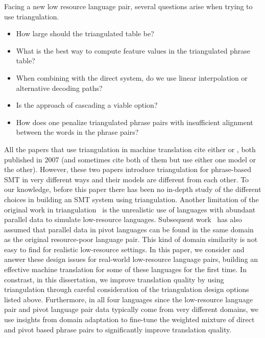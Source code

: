 Facing a new low resource language pair, several questions arise when trying to use triangulation. 

\begin{itemize}\addtolength{\itemsep}{-0.4\baselineskip}
        \item How large should the triangulated table be?
        \item What is the best way to compute feature values in the triangulated phrase table?
        \item When combining with the direct system, do we use linear interpolation or alternative decoding paths?
        \item Is the approach of cascading a viable option?
        \item How does one penalize triangulated phrase pairs with insufficient alignment between the words in the phrase pairs?
\end{itemize}


All the papers that use triangulation in machine translation cite either \cite{Utiyama:07} or \cite{Cohn:07}, both published in 2007 (and sometimes cite both of them but use either one model or the other). However, these two papers introduce triangulation for phrase-based SMT in very different ways and their models are different from each other. To our knowledge, before this paper there has been no in-depth study of the different choices in building an SMT system using triangulation. Another limitation of the original work in triangulation~\cite{Utiyama:07,Cohn:07} is the unrealistic use of languages with abundant parallel data to simulate low-resource languages. Subsequent work~\cite{Nakov:12,Nakovemnlp:12,Gispert:06,Huck:12} has also assumed that parallel data in pivot languages can be found in the same domain as the original resource-poor language pair. This kind of domain similarity is not easy to find for realistic low-resource settings. In this paper, we consider and answer these design issues for real-world low-resource language pairs, building an effective machine translation for some of these languages for the first time. In constrast, in this dissertation, we improve translation quality by using triangulation through careful consideration of the triangulation design options listed above. Furthermore, in all four languages since the low-resource language pair and pivot language pair data typically come from very different domains, we use insights from domain adaptation to fine-tune the weighted mixture of direct and pivot based phrase pairs to significantly improve translation quality. 


